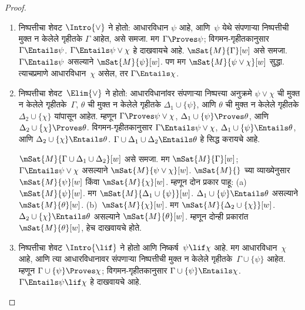 \begin{proof}
\begin{enumerate}
  \item निष्पत्तीचा शेवट $\Intro{\lor}$ ने होतो:
    आधारविधान $\psi$ आहे,
      आणि~$\psi$ येथे संपणाऱ्या निष्पत्तीची
      मुक्त न केलेले गृहीतके $\Gamma$ आहेत,
      असे समजा. मग $\Gamma \Proves \psi$;
      विगमन-गृहीतकानुसार $\Gamma \Entails \psi$.
      $\Gamma \Entails \psi \lor \chi$ हे दाखवायचे आहे.
      $\mSat{M}{\Gamma}[w]$ असे समजा.
      $\Gamma \Entails \psi$ असल्याने
      $\mSat{M}{\psi}[w]$. पण मग
      $\mSat{M}{\psi \lor \chi}[w]$ सुद्धा.
      त्याचप्रमाणे आधारविधान~$\chi$ असेल, तर
      $\Gamma \Entails \chi$.

  \item निष्पत्तीचा शेवट~$\Elim{\lor}$ ने होतो:
    आधारविधानांवर संपणाऱ्या
      निष्पत्त्या अनुक्रमे $\psi \lor \chi$ ची
      मुक्त न केलेले गृहीतके~$\Gamma$,
      $\theta$ ची मुक्त न केलेले गृहीतके
      $\Delta_1 \cup \{\psi\}$, आणि $\theta$ ची
      मुक्त न केलेले गृहीतके
      $\Delta_2 \cup \{\chi\}$ यांपासून आहेत.
      म्हणून $\Gamma \Proves \psi \lor \chi$,
      $\Delta_1 \cup \{\psi\} \Proves \theta$,
      आणि $\Delta_2 \cup \{\chi\} \Proves \theta$.
      विगमन-गृहीतकानुसार
      $\Gamma \Entails \psi \lor \chi$,
      $\Delta_1 \cup \{\psi\} \Entails \theta$,
      आणि $\Delta_2 \cup \{\chi\} \Entails \theta$.
      $\Gamma \cup \Delta_1 \cup \Delta_2 \Entails \theta$
      हे सिद्ध करायचे आहे.

    $\mSat{M}{\Gamma \cup \Delta_1 \cup \Delta_2}[w]$
    असे समजा. मग $\mSat{M}{\Gamma}[w]$;
    $\Gamma \Entails \psi \lor \chi$ असल्याने
    $\mSat{M}{\psi \lor \chi}[w]$.
    $\mSat{M}{}$ च्या व्याख्येनुसार
    $\mSat{M}{\psi}[w]$ किंवा
    $\mSat{M}{\chi}[w]$. म्हणून दोन प्रकार पाहू:
    (a)~$\mSat{M}{\psi}[w]$. मग
    $\mSat{M}{\Delta_1 \cup \{\psi\}}[w]$.
    $\Delta_1 \cup \{\psi\} \Entails \theta$
    असल्याने $\mSat{M}{\theta}[w]$.
    (b)~$\mSat{M}{\chi}[w]$. मग
    $\mSat{M}{\Delta_2 \cup \{\chi\}}[w]$.
    $\Delta_2 \cup \{\chi\} \Entails \theta$
    असल्याने $\mSat{M}{\theta}[w]$.
    म्हणून दोन्ही प्रकारांत
    $\mSat{M}{\theta}[w]$, हेच दाखवायचे होते.

  \item निष्पत्तीचा शेवट $\Intro{\lif}$ ने होतो
    आणि निष्कर्ष~$\psi\lif \chi$ आहे. मग
    आधारविधान~$\chi$ आहे, आणि त्या आधारविधानावर
    संपणाऱ्या निष्पत्तीची
    मुक्त न केलेले गृहीतके~$\Gamma \cup
    \{\psi\}$ आहेत. म्हणून
    $\Gamma \cup \{\psi\} \Proves \chi$;
    विगमन-गृहीतकानुसार
    $\Gamma \cup \{\psi\} \Entails \chi$.
    $\Gamma \Entails \psi \lif \chi$ हे दाखवायचे आहे.


\end{enumerate}
\end{proof}
